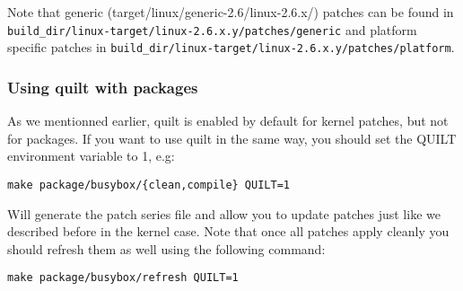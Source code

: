 Note that generic (target/linux/generic-2.6/linux-2.6.x/) patches can be found in 
\texttt{build\_dir/linux-target/linux-2.6.x.y/patches/generic} and platform specific
patches in \texttt{build\_dir/linux-target/linux-2.6.x.y/patches/platform}.

\subsubsection{Using quilt with packages}

As we mentionned earlier, quilt is enabled by default for kernel patches, but not for
packages. If you want to use quilt in the same way, you should set the QUILT environment
variable to 1, e.g:

\begin{Verbatim}
make package/busybox/{clean,compile} QUILT=1
\end{Verbatim}

Will generate the patch series file and allow you to update patches just like we described
before in the kernel case. Note that once all patches apply cleanly you should refresh them
as well using the following command:

\begin{Verbatim}
make package/busybox/refresh QUILT=1
\end{Verbatim}
